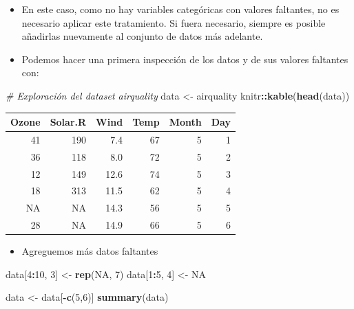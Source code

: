 \documentclass[
]{book}
\newenvironment{Shaded}{\begin{snugshade}}{\end{snugshade}}
\newcommand{\CommentTok}[1]{\textcolor[rgb]{0.56,0.35,0.01}{\textit{#1}}}
\newcommand{\ConstantTok}[1]{\textcolor[rgb]{0.56,0.35,0.01}{#1}}
\newcommand{\DecValTok}[1]{\textcolor[rgb]{0.00,0.00,0.81}{#1}}
\newcommand{\FunctionTok}[1]{\textcolor[rgb]{0.13,0.29,0.53}{\textbf{#1}}}
\newcommand{\NormalTok}[1]{#1}
\newcommand{\OtherTok}[1]{\textcolor[rgb]{0.56,0.35,0.01}{#1}}
\newcommand{\SpecialCharTok}[1]{\textcolor[rgb]{0.81,0.36,0.00}{\textbf{#1}}}
\providecommand{\tightlist}{%
  \setlength{\itemsep}{0pt}\setlength{\parskip}{0pt}}
\begin{document}
\begin{itemize}
\item
  En este caso, como no hay variables categóricas con valores faltantes, no es necesario aplicar este tratamiento. Si fuera necesario, siempre es posible añadirlas nuevamente al conjunto de datos más adelante.
\item
  Podemos hacer una primera inspección de los datos y de sus valores faltantes con:
\end{itemize}

\begin{Shaded}
\begin{Highlighting}[]
\CommentTok{\# Exploración del dataset airquality}
\NormalTok{data }\OtherTok{\textless{}{-}}\NormalTok{ airquality}
\NormalTok{knitr}\SpecialCharTok{::}\FunctionTok{kable}\NormalTok{(}\FunctionTok{head}\NormalTok{(data))}
\end{Highlighting}
\end{Shaded}

\begin{tabular}{r|r|r|r|r|r}
\hline
Ozone & Solar.R & Wind & Temp & Month & Day\\
\hline
41 & 190 & 7.4 & 67 & 5 & 1\\
\hline
36 & 118 & 8.0 & 72 & 5 & 2\\
\hline
12 & 149 & 12.6 & 74 & 5 & 3\\
\hline
18 & 313 & 11.5 & 62 & 5 & 4\\
\hline
NA & NA & 14.3 & 56 & 5 & 5\\
\hline
28 & NA & 14.9 & 66 & 5 & 6\\
\hline
\end{tabular}

\begin{itemize}
\tightlist
\item
  Agreguemos más datos faltantes
\end{itemize}

\begin{Shaded}
\begin{Highlighting}[]
\NormalTok{data[}\DecValTok{4}\SpecialCharTok{:}\DecValTok{10}\NormalTok{, }\DecValTok{3}\NormalTok{] }\OtherTok{\textless{}{-}} \FunctionTok{rep}\NormalTok{(}\ConstantTok{NA}\NormalTok{, }\DecValTok{7}\NormalTok{)}
\NormalTok{data[}\DecValTok{1}\SpecialCharTok{:}\DecValTok{5}\NormalTok{, }\DecValTok{4}\NormalTok{] }\OtherTok{\textless{}{-}} \ConstantTok{NA}

\NormalTok{data }\OtherTok{\textless{}{-}}\NormalTok{ data[}\SpecialCharTok{{-}}\FunctionTok{c}\NormalTok{(}\DecValTok{5}\NormalTok{,}\DecValTok{6}\NormalTok{)]}
\FunctionTok{summary}\NormalTok{(data)}
\end{Highlighting}
\end{Shaded}
\end{document}
